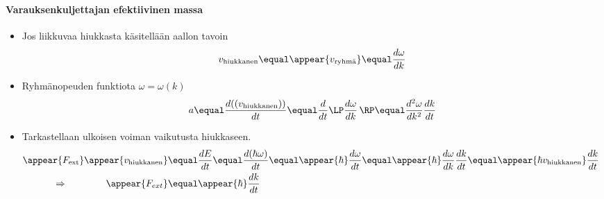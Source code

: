 \begin{frame}
\frametitle{\texorpdfstring{\culine[\sectiontitleulinecolor]{\sectiontitle}}{\sectiontitle} }
\framesubtitle{Varauksenkuljettajan efektiivinen massa}
\appear{}

\seminormal
\begin{itemize}
	\item Jos liikkuvaa hiukkasta käsitellään aallon tavoin\vspace{-4mm}
\[
v_{\text {hiukkanen}}  \equal \appear{v_{\text {ryhmä}}}  \equal \frac{d \omega}{d k}
\]
\item Ryhmänopeuden funktiota $\omega=\omega(k)$ 
\[
a  \equal \frac{d \textrm{((}v_{\text {hiukkanen}} \textrm{))}}{d t}  \equal \frac{d}{d t} \LP \frac{d \omega}{d k} \,\RP  \equal \frac{d^{2} \omega}{d k^{2}} \frac{d k}{d t}
\]

\item Tarkastellaan ulkoisen voiman vaikutusta hiukkaseen.
$$
\begin{aligned}
\appear{F_{\text {ext}}} \appear{v_{\text {hiukkanen}}} & \equal \frac{d E}{d t}  \equal \frac{d(\hbar \omega)}{d t}  \equal \appear{\hbar} \frac{d \omega}{d t} \equal \appear{\hbar} \frac{d \omega}{d k} \frac{d k}{d t}  \equal \appear{\hbar v_{\text {hiukkanen}}} \frac{d k}{d t} \qquad \\
\Rightarrow \qquad \qquad \appear{F_{ext}}&  \equal \appear{\hbar} \frac{d k}{d t}
\end{aligned}
$$
\end{itemize}

\endofslide 
\end{frame}

